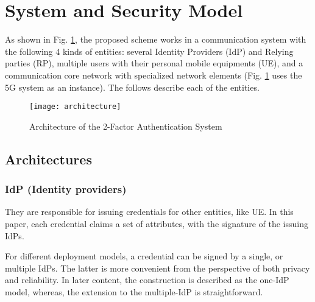 \section{System and Security Model}
As shown in Fig. \ref{fig:model}, the proposed scheme works in a communication system with the following 4 kinds of entities: several Identity Providers (IdP) and Relying parties (RP), multiple users with their personal mobile equipments (UE), and a communication core network with specialized network elements (Fig. \ref{fig:model} uses the 5G system as an instance). The follows describe each of the entities. 



\begin{figure}[t]
	\centering
	\texttt{[image: architecture]}
	\caption{Architecture of the 2-Factor Authentication System}\label{fig:model}
\end{figure}

\subsection{Architectures}
\subsubsection{IdP (Identity providers)}
They are responsible for issuing credentials for other entities, like UE. In this paper, each credential claims a set of attributes, with the signature of the issuing IdPs. 

For different deployment models, a credential can be signed by a single, or multiple IdPs. The latter is more convenient from the perspective of both privacy and reliability. In later content, the construction is described as the one-IdP model, whereas, the extension to the multiple-IdP is straightforward.


